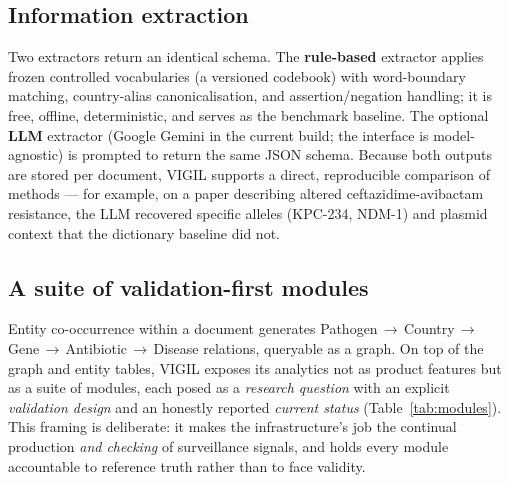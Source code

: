 \documentclass[10pt]{article}
\begin{document}
\subsection{Information extraction}
Two extractors return an identical schema. The \textbf{rule-based} extractor
applies frozen controlled vocabularies (a versioned codebook) with word-boundary
matching, country-alias canonicalisation, and assertion/negation handling; it is
free, offline, deterministic, and serves as the benchmark baseline. The optional
\textbf{LLM} extractor (Google Gemini in the current build; the interface is
model-agnostic) is prompted to return the same JSON schema. Because both outputs
are stored per document, VIGIL supports a direct, reproducible comparison of
methods --- for example, on a paper describing altered ceftazidime-avibactam
resistance, the LLM recovered specific alleles (KPC-234, NDM-1) and plasmid context
that the dictionary baseline did not.

\subsection{A suite of validation-first modules}
Entity co-occurrence within a document generates
Pathogen\,$\rightarrow$\,Country\,$\rightarrow$\,Gene\,$\rightarrow$\,Antibiotic\,$\rightarrow$\,Disease
relations, queryable as a graph. On top of the graph and entity tables, VIGIL exposes
its analytics not as product features but as a suite of modules, each posed as a
\emph{research question} with an explicit \emph{validation design} and an honestly
reported \emph{current status} (Table~\ref{tab:modules}). This framing is deliberate:
it makes the infrastructure's job the continual production \emph{and checking} of
surveillance signals, and holds every module accountable to reference truth rather
than to face validity.
\end{document}
